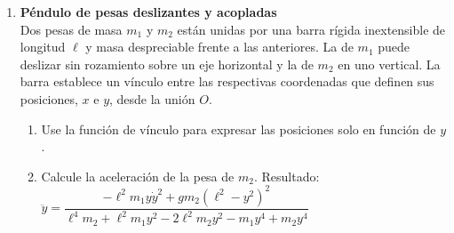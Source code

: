 \documentclass[11pt, spanish, a4paper, twoside]{article}
\begin{document}
\begin{enumerate}
		
	\item 
	\begin{minipage}[t][2.4cm]{0.75\textwidth}
		\textbf{Péndulo de pesas deslizantes y acopladas}\\ 
		Dos pesas de masa \(m_1\) y \(m_2\) están unidas por una barra rígida inextensible de longitud \(\ell\) y masa despreciable frente a las anteriores.
		La de \(m_1\) puede deslizar sin rozamiento sobre un eje horizontal y la de \(m_2\) en uno vertical.
		La barra establece un vínculo entre las respectivas coordenadas que definen sus posiciones, \(x\) e \(y\), desde la unión \(O\).
	\end{minipage}
	\begin{minipage}[c][1.5cm][t]{0.25\textwidth}
		
	\end{minipage}
	\begin{enumerate}
		\item Use la función de vínculo para expresar las posiciones solo en función de \(y\).
		\item Calcule la aceleración de la pesa de \(m_2\). %
		Resultado:
			$\ddot{y} = 
			\dfrac{- \ell^{2} m_{1} y \dot{y}^{2} + g m_{2} \left(\ell^{2} - y^{2}\right)^{2}}{\ell^{4} m_{2} + \ell^{2} m_{1} y^{2} - 2 \ell^{2} m_{2} y^{2} - m_{1} y^{4} + m_{2} y^{4}}$

\end{enumerate}
\end{enumerate}
\end{document}
